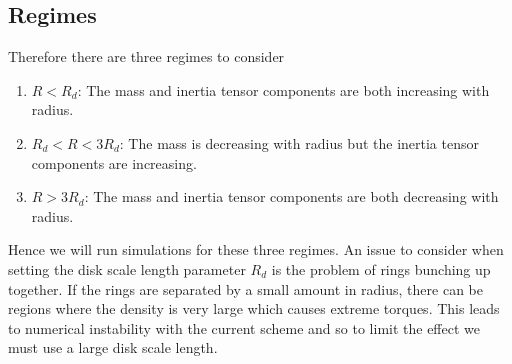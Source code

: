 \subsection{Regimes}
Therefore there are three regimes to consider
\begin{enumerate}
    \item{
                \( R < R_d \): The mass and inertia tensor components are both increasing with radius.
          }
    \item{
                \( R_d < R < 3R_d \): The mass is decreasing with radius but the inertia tensor components are increasing.
          }
    \item{
                \( R > 3R_d \): The mass and inertia tensor components are both decreasing with radius.
          }
\end{enumerate}
Hence we will run simulations for these three regimes. An issue to consider when setting the disk scale length parameter \( R_d \)
is the problem of rings bunching up together. If the rings are separated by a small amount in radius, there can be regions
where the density is very large which causes extreme torques. This leads to numerical instability with the current scheme and
so to limit the effect we must use a large disk scale length.
